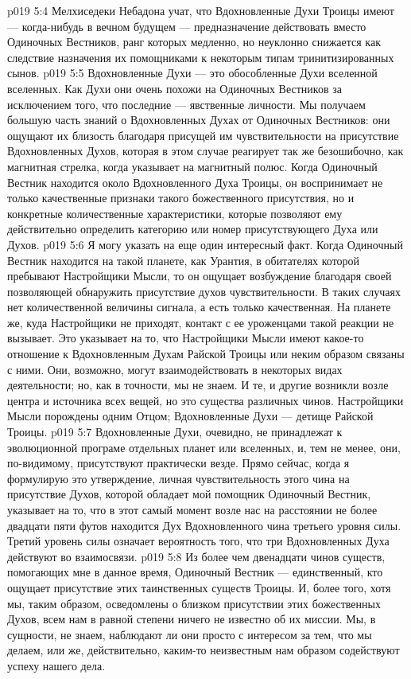 \vs p019 5:4 Мелхиседеки Небадона учат, что Вдохновленные Духи Троицы имеют --- когда\hyp{}нибудь в вечном будущем --- предназначение действовать вместо Одиночных Вестников, ранг которых медленно, но неуклонно снижается как следствие назначения их помощниками к некоторым типам тринитизированных сынов.
\vs p019 5:5 \pc Вдохновленные Духи --- это обособленные Духи вселенной вселенных. Как Духи они очень похожи на Одиночных Вестников за исключением того, что последние --- явственные личности. Мы получаем большую часть знаний о Вдохновленных Духах от Одиночных Вестников: они ощущают их близость благодаря присущей им чувствительности на присутствие Вдохновленных Духов, которая в этом случае реагирует так же безошибочно, как магнитная стрелка, когда указывает на магнитный полюс. Когда Одиночный Вестник находится около Вдохновленного Духа Троицы, он воспринимает не только качественные признаки такого божественного присутствия, но и конкретные количественные характеристики, которые позволяют ему действительно определить категорию или номер присутствующего Духа или Духов.
\vs p019 5:6 Я могу указать на еще один интересный факт. Когда Одиночный Вестник находится на такой планете, как Урантия, в обитателях которой пребывают Настройщики Мысли, то он ощущает возбуждение благодаря своей позволяющей обнаружить присутствие духов чувствительности. В таких случаях нет количественной величины сигнала, а есть только качественная. На планете же, куда Настройщики не приходят, контакт с ее уроженцами такой реакции не вызывает. Это указывает на то, что Настройщики Мысли имеют какое\hyp{}то отношение к Вдохновленным Духам Райской Троицы или неким образом связаны с ними. Они, возможно, могут взаимодействовать в некоторых видах деятельности; но, как в точности, мы не знаем. И те, и другие возникли возле центра и источника всех вещей, но это существа различных чинов. Настройщики Мысли порождены одним Отцом; Вдохновленные Духи --- детище Райской Троицы.
\vs p019 5:7 Вдохновленные Духи, очевидно, не принадлежат к эволюционной програме отдельных планет или вселенных, и, тем не менее, они, по\hyp{}видимому, присутствуют практически везде. Прямо сейчас, когда я формулирую это утверждение, личная чувствительность этого чина на присутствие Духов, которой обладает мой помощник Одиночный Вестник, указывает на то, что в этот самый момент возле нас на расстоянии не более двадцати пяти футов находится Дух Вдохновленного чина третьего уровня силы. Третий уровень силы означает вероятность того, что три Вдохновленных Духа действуют во взаимосвязи.
\vs p019 5:8 \pc Из более чем двенадцати чинов существ, помогающих мне в данное время, Одиночный Вестник --- единственный, кто ощущает присутствие этих таинственных существ Троицы. И, более того, хотя мы, таким образом, осведомлены о близком присутствии этих божественных Духов, всем нам в равной степени ничего не известно об их миссии. Мы, в сущности, не знаем, наблюдают ли они просто с интересом за тем, что мы делаем, или же, действительно, каким\hyp{}то неизвестным нам образом содействуют успеху нашего дела.

